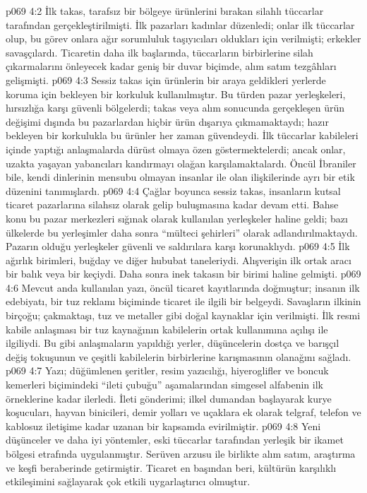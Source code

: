 \vs p069 4:2 İlk takas, tarafsız bir bölgeye ürünlerini bırakan silahlı tüccarlar tarafından gerçekleştirilmişti. İlk pazarları kadınlar düzenledi; onlar ilk tüccarlar olup, bu görev onlara ağır sorumluluk taşıyıcıları oldukları için verilmişti; erkekler savaşçılardı. Ticaretin daha ilk başlarında, tüccarların birbirlerine silah çıkarmalarını önleyecek kadar geniş bir duvar biçimde, alım satım tezgâhları gelişmişti.
\vs p069 4:3 Sessiz takas için ürünlerin bir araya geldikleri yerlerde koruma için bekleyen bir korkuluk kullanılmıştır. Bu türden pazar yerleşkeleri, hırsızlığa karşı güvenli bölgelerdi; takas veya alım sonucunda gerçekleşen ürün değişimi dışında bu pazarlardan hiçbir ürün dışarıya çıkmamaktaydı; hazır bekleyen bir korkulukla bu ürünler her zaman güvendeydi. İlk tüccarlar kabileleri içinde yaptığı anlaşmalarda dürüst olmaya özen göstermektelerdi; ancak onlar, uzakta yaşayan yabancıları kandırmayı olağan karşılamaktalardı. Öncül İbraniler bile, kendi dinlerinin mensubu olmayan insanlar ile olan ilişkilerinde ayrı bir etik düzenini tanımışlardı.
\vs p069 4:4 Çağlar boyunca sessiz takas, insanların kutsal ticaret pazarlarına silahsız olarak gelip buluşmasına kadar devam etti. Bahse konu bu pazar merkezleri sığınak olarak kullanılan yerleşkeler haline geldi; bazı ülkelerde bu yerleşimler daha sonra “mülteci şehirleri” olarak adlandırılmaktaydı. Pazarın olduğu yerleşkeler güvenli ve saldırılara karşı korunaklıydı.
\vs p069 4:5 İlk ağırlık birimleri, buğday ve diğer hububat taneleriydi. Alışverişin ilk ortak aracı bir balık veya bir keçiydi. Daha sonra inek takasın bir birimi haline gelmişti.
\vs p069 4:6 Mevcut anda kullanılan yazı, öncül ticaret kayıtlarında doğmuştur; insanın ilk edebiyatı, bir tuz reklamı biçiminde ticaret ile ilgili bir belgeydi. Savaşların ilkinin birçoğu; çakmaktaşı, tuz ve metaller gibi doğal kaynaklar için verilmişti. İlk resmi kabile anlaşması bir tuz kaynağının kabilelerin ortak kullanımına açılışı ile ilgiliydi. Bu gibi anlaşmaların yapıldığı yerler, düşüncelerin dostça ve barışçıl değiş tokuşunun ve çeşitli kabilelerin birbirlerine karışmasının olanağını sağladı.
\vs p069 4:7 Yazı; düğümlenen şeritler, resim yazıcılığı, hiyeroglifler ve boncuk kemerleri biçimindeki “ileti çubuğu” aşamalarından simgesel alfabenin ilk örneklerine kadar ilerledi. İleti gönderimi; ilkel dumandan başlayarak kurye koşucuları, hayvan binicileri, demir yolları ve uçaklara ek olarak telgraf, telefon ve kablosuz iletişime kadar uzanan bir kapsamda evirilmiştir.
\vs p069 4:8 Yeni düşünceler ve daha iyi yöntemler, eski tüccarlar tarafından yerleşik bir ikamet bölgesi etrafında uygulanmıştır. Serüven arzusu ile birlikte alım satım, araştırma ve keşfi beraberinde getirmiştir. Ticaret en başından beri, kültürün karşılıklı etkileşimini sağlayarak çok etkili uygarlaştırıcı olmuştur.
